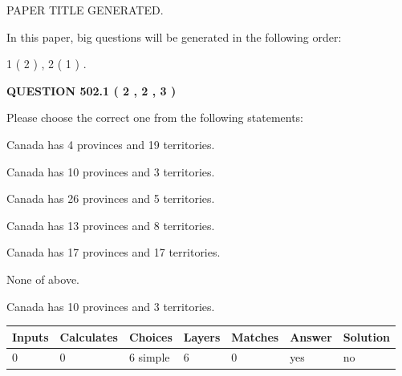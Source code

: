 \documentclass[12pt]{article}
\begin{document}
   
   
   
   
   
 \vspace{0.2in}
 
 
 
 
   
   
 PAPER TITLE GENERATED.
   
   
   
\vspace{0.2in}
   
In this paper, big questions will be generated in the following order: 
   
   
   1 ( 2 )
 ,
   2 ( 1 )
 .
  
\vspace{0.2in}
  
{\textbf{\Large{QUESTION
502.1 
 ( 2 , 2 , 3 )
}}}
  
  
Please choose the correct one from the following statements:
 
 
Canada has   4 provinces and  19 territories.
 
 
Canada has 10  provinces and 3 territories.
 
 
Canada has  26 provinces and  5 territories.
 
 
Canada has  13 provinces and  8 territories.
 
 
Canada has  17 provinces and  17 territories.
 
 
 None of above.
 
 
\noindent{}
 
 
Canada has 10  provinces and 3 territories.
 
 
\noindent{}
 
 
   
   
   
   
\noindent\begin{tabular}{|l|l|l|l|l|l|l|}
 \hline
Inputs & Calculates & Choices & Layers & Matches & Answer & Solution \\ \hline
 0  & 
 0  & 
 6
  simple  
  & 
 6  & 
 0  & 
  yes & 
  no 
  \\ \hline
 \end{tabular}
   
\end{document}
